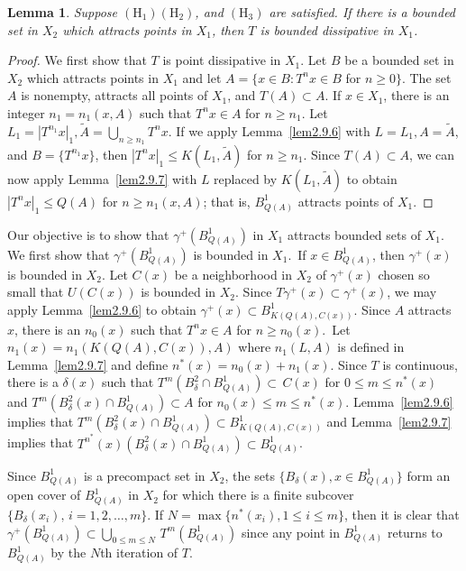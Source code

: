 \documentclass{surv-l}
\theoremstyle{plain}
\newtheorem{lemma}[theorem]{Lemma}
\theoremstyle{definition}
\numberwithin{equation}{section}
\numberwithin{figure}{chapter}
\begin{document}
\begin{lemma}\label{lem2.9.8} Suppose $(\mathrm{H}_{1})(\mathrm{H}_{2})$, and $(\mathrm{H}_{3})$ are satisfied. If there is a bounded set in $X_{2}$ which attracts points in $X_{1}$, then $T$ is bounded dissipative in $X_{1}$.
\end{lemma}

\begin{proof} We first show that $T$ is point dissipative in $X_{1}$. Let $B$ be a bounded set in $X_{2}$ which attracts points in $X_{1}$ and let $A=\{x\in B\!:T^{n}x\in B$ for $n\geq 0\}$. The set $A$ is nonempty, attracts all points of $X_{1}$, and $ T(A)\subset A$. If $x\in X_{1}$, there is an integer $n_{1}=n_{1}(x, A)$ such that $T^{n}x\in A$ for $n\geq n_{1}$. Let $L_{1}=|T^{n_{1}}x|_{1},\tilde{A}=\bigcup_{n\geq n_{1}}T^{n}x$. If we apply Lemma~\ref{lem2.9.6} with $L=L_{1}, A=\tilde{A}$, and $B=\{T^{n_{1}}x\}$, then $|T^{n}x|_{1}\leq K(L_{1},\tilde{A})$ for $n\geq n_{1}$. Since $T(A)\subset A$, we can now apply Lemma~\ref{lem2.9.7} with $L$ replaced by $K(L_{1},\tilde{A})$ to obtain $|T^{n}x|_{1}\leq Q(A)$ for $n\geq n_{1}(x,A)$; that is, $B_{Q(A)}^{1}$ attracts points of $X_{1}$.
\end{proof}

Our objective is to show that $\gamma^{+}(B_{Q(A)}^{1})$ in $X_{1}$ attracts bounded sets of $X_{1}$. We first show that $\gamma^{+}(B_{Q(A)}^{1})$ is bounded in $X_{1}$.\, If $x\in B_{Q(A)}^{1}$, then $\gamma^{+}(x)$ is bounded in $X_{2}$. Let $C(x)$ be a neighborhood in $X_{2}$ of $\gamma^{+}(x)$ chosen so small that $U(C(x))$ is bounded in $X_{2}$. Since $T\gamma^{+}(x)\subset\gamma^{+}(x)$, we may apply Lemma~\ref{lem2.9.6} to obtain $\gamma^{+}(x)\subset B_{K(Q(A),C(x))}^{1}$. Since $A$ attracts $x$, there is an $n_{0}(x)$ such that $T^{n}x\in A$ for $n\geq n_{0}(x)$.\, Let $n_{1}(x)=n_{1}(K(Q(A), C(x)), A)$ where $n_{1}(L, A)$ is defined in Lemma~\ref{lem2.9.7} and define $n^{\ast}(x)=n_{0}(x)+n_{1}(x)$. Since $T$ is continuous, there is a $\delta(x)$ such that $T^{m}(B_{\delta}^{2}\cap B_{Q(A)}^{1})\subset\, C(x)$ for $0\leq m\leq n^{\ast}(x)$ and $T^{m}(B_{\delta}^{2}(x)\cap B_{Q(A)}^{1})\subset A$ for $n_{0}(x)\leq m\leq n^{\ast}(x)$. Lemma~\ref{lem2.9.6} implies that $T^{m}(B_{\delta}^{2}(x)\cap B_{Q(A)}^{1})\subset B_{K(Q(A),C(x))}^{1}$ and Lemma~\ref{lem2.9.7} implies that $T^{{n}^{\ast}}(x)(B_{\delta}^{2}(x)\cap B_{Q(A)}^{1})\subset B_{Q(A)}^{1}$.

Since $B_{Q(A)}^{1}$ is a precompact set in $X_{2}$, the sets $\{B_{\delta}(x), x\in B_{Q(A)}^{1}\}$ form an open cover of $B_{Q(A)}^{1}$ in $X_{2}$ for which there is a finite subcover $\{B_{\delta}(x_{i}),\, i= 1,2, \ldots, m\}$. If $N=\max\{n^{\ast}(x_{i}), 1\leq i\leq m\}$, then it is clear that $\gamma^{+}(B_{Q(A)}^{1})\subset \bigcup_{0\leq m\leq N}\,T^{m}(B_{Q(A)}^{1})$ since any point in $B_{Q(A)}^{1}$ returns to $B_{Q(A)}^{1}$ by the $N$th iteration of $T$.
\end{document}
